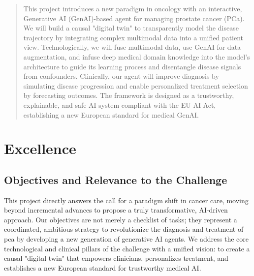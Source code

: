 \documentclass[11pt, a4paper]{article}
\begin{document}


\begin{abstract}
This project introduces a new paradigm in oncology with an interactive, Generative AI (GenAI)-based agent for managing prostate cancer (PCa). We will build a causal "digital twin" to transparently model the disease trajectory by integrating complex multimodal data into a unified patient view. Technologically, we will fuse multimodal data, use GenAI for data augmentation, and infuse deep medical domain knowledge into the model's architecture to guide its learning process and disentangle disease signals from confounders. Clinically, our agent will improve diagnosis by simulating disease progression and enable personalized treatment selection by forecasting outcomes. The framework is designed as a trustworthy, explainable, and safe AI system compliant with the EU AI Act, establishing a new European standard for medical GenAI.
\end{abstract}

\section{Excellence}

\subsection{Objectives and Relevance to the Challenge}
This project directly answers the call for a paradigm shift in cancer care, moving beyond incremental advances to propose a truly transformative, AI-driven approach. Our objectives are not merely a checklist of tasks; they represent a coordinated, ambitious strategy to revolutionize the diagnosis and treatment of \gls{pca} by developing a new generation of generative AI agents. We address the core technological and clinical pillars of the challenge with a unified vision: to create a causal "digital twin" that empowers clinicians, personalizes treatment, and establishes a new European standard for trustworthy medical AI.
\end{document}
